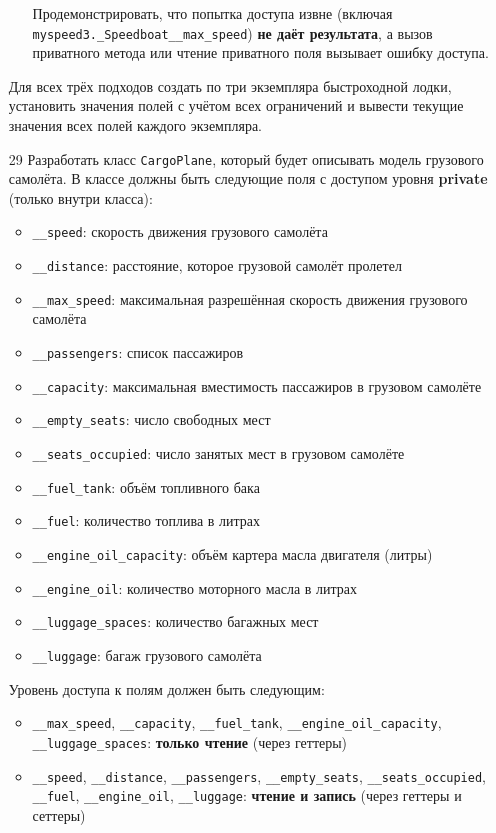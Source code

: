 \begin{enumerate}
\begin{enumerate}
    Продемонстрировать, что попытка доступа извне (включая \texttt{myspeed3.\_Speedboat\_\_max\_speed}) \textbf{не даёт результата}, а вызов приватного метода или чтение приватного поля вызывает ошибку доступа.
\end{enumerate}
Для всех трёх подходов создать по три экземпляра быстроходной лодки, установить значения полей с учётом всех ограничений и вывести текущие значения всех полей каждого экземпляра.
\item[29] Разработать класс \texttt{CargoPlane}, который будет описывать модель грузового самолёта. В классе должны быть следующие поля с доступом уровня \textbf{private} (только внутри класса):
\begin{itemize}
    \item \texttt{\_\_speed}: скорость движения грузового самолёта  
    \item \texttt{\_\_distance}: расстояние, которое грузовой самолёт пролетел  
    \item \texttt{\_\_max\_speed}: максимальная разрешённая скорость движения грузового самолёта  
    \item \texttt{\_\_passengers}: список пассажиров  
    \item \texttt{\_\_capacity}: максимальная вместимость пассажиров в грузовом самолёте  
    \item \texttt{\_\_empty\_seats}: число свободных мест  
    \item \texttt{\_\_seats\_occupied}: число занятых мест в грузовом самолёте  
    \item \texttt{\_\_fuel\_tank}: объём топливного бака  
    \item \texttt{\_\_fuel}: количество топлива в литрах  
    \item \texttt{\_\_engine\_oil\_capacity}: объём картера масла двигателя (литры)  
    \item \texttt{\_\_engine\_oil}: количество моторного масла в литрах  
    \item \texttt{\_\_luggage\_spaces}: количество багажных мест  
    \item \texttt{\_\_luggage}: багаж грузового самолёта  
\end{itemize}
Уровень доступа к полям должен быть следующим:
\begin{itemize}
    \item \texttt{\_\_max\_speed}, \texttt{\_\_capacity}, \texttt{\_\_fuel\_tank}, \texttt{\_\_engine\_oil\_capacity}, \texttt{\_\_luggage\_spaces}: \textbf{только чтение} (через геттеры)  
    \item \texttt{\_\_speed}, \texttt{\_\_distance}, \texttt{\_\_passengers}, \texttt{\_\_empty\_seats}, \texttt{\_\_seats\_occupied}, \texttt{\_\_fuel}, \texttt{\_\_engine\_oil}, \texttt{\_\_luggage}: \textbf{чтение и запись} (через геттеры и сеттеры)

\end{itemize}
\end{enumerate}
